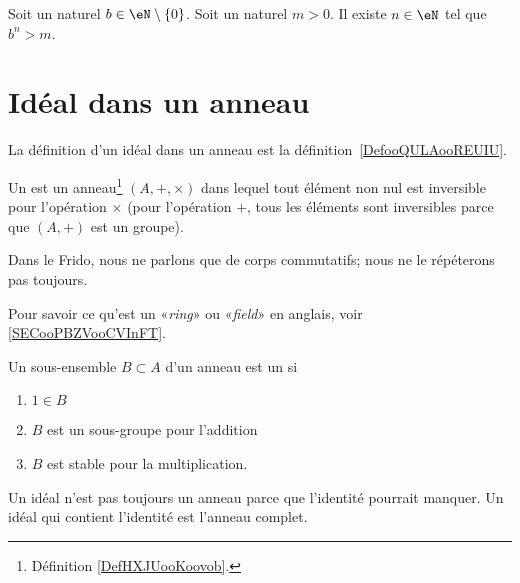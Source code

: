 \begin{proposition}	\label{PROPooPLLSooUpiLKa}
	Soit un naturel \( b\in\eN\setminus\{ 0 \}\). Soit un naturel \( m>0\). Il existe \( n\in \eN\) tel que \( b^n>m\).
\end{proposition}


\section{Idéal dans un anneau}

La définition d'un idéal dans un anneau est la définition~\ref{DefooQULAooREUIU}.

\begin{definition}  \label{DefTMNooKXHUd}
	Un  est un anneau\footnote{Définition \ref{DefHXJUooKoovob}.} \( (A, +,\times)\) dans lequel tout élément non nul est inversible pour l'opération \( \times\) (pour l'opération \( +\), tous les éléments sont inversibles parce que \( (A,+)\) est un groupe).
\end{definition}

\begin{normaltext}
	Dans le Frido, nous ne parlons que de corps commutatifs; nous ne le répéterons pas toujours.
\end{normaltext}

\begin{normaltext}
	Pour savoir ce qu'est un «\emph{ring}» ou «\emph{field}» en anglais, voir \ref{SECooPBZVooCVInFT}.
\end{normaltext}

\begin{definition}  \label{DefAJVTPxb}
	Un sous-ensemble \( B\subset A\) d'un anneau est un  si
	\begin{enumerate}
		\item
		      \( 1\in B\)
		\item
		      \( B\) est un sous-groupe pour l'addition
		\item
		      \( B\) est stable pour la multiplication.
	\end{enumerate}
\end{definition}

\begin{remark}
	Un idéal n'est pas toujours un anneau parce que l'identité pourrait manquer. Un idéal qui contient l'identité est l'anneau complet.
\end{remark}

